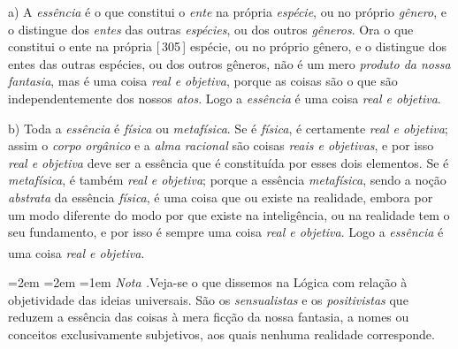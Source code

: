 \documentclass[12pt,a4paper]{article}
\newcommand{\pg}[1]{\thinspace\textup{[\,#1\,]}\thinspace}
\newcommand{\subp}[1]{\medskip\noindent#1)\quad}
\renewcommand\footnote[1]{%
    \stepcounter{footnote}\textsuperscript{\thefootnote}%
    \par
    {\footnotesize
     \leftskip=2em \rightskip=2em \parindent=1em
     \addvspace{\medskipamount}%
     \noindent\textit{Nota \thefootnote.}\enspace #1\par
     \addvspace{\medskipamount}}%
  }
\begin{document}
\subp{a} A \emph{essência} é o que constitui o \emph{ente} na própria
\emph{espécie}, ou no próprio \emph{gênero}, e o distingue dos \emph{entes} das
outras \emph{espécies}, ou dos outros \emph{gêneros}. Ora o que constitui o
ente na própria \pg{305} espécie, ou no próprio gênero, e o distingue dos entes
das outras espécies, ou dos outros gêneros, não é um mero \emph{produto da
nossa fantasia}, mas é uma coisa \emph{real e objetiva}, porque as coisas são o
que são independentemente dos nossos \emph{atos}. Logo a \emph{essência} é uma
coisa \emph{real e objetiva}.

\subp{b} Toda a \emph{essência} é \emph{física} ou \emph{metafísica}. Se é
\emph{física}, é certamente \emph{real e objetiva}; assim o \emph{corpo
orgânico} e a \emph{alma racional} são coisas \emph{reais e objetivas}, e por
isso \emph{real e objetiva} deve ser a essência que é constituída por esses dois
elementos. \textemdash{} Se é \emph{metafísica}, é também \emph{real e
objetiva}; porque a essência \emph{metafísica}, sendo a noção \emph{abstrata} da
essência \emph{física}, é uma coisa que \textemdash{} ou existe na realidade,
embora por um modo diferente do modo por que existe na inteligência,
\textemdash{} ou na realidade tem o seu fundamento, e por isso é sempre uma
coisa \emph{real e objetiva}. Logo a \emph{essência} é uma coisa \emph{real e
objetiva}.\footnote{Veja-se o que dissemos na Lógica com relação à
objetividade das ideias universais. \textemdash{} São os \emph{sensualistas} e
os \emph{positivistas} que reduzem a essência das coisas à mera ficção da nossa
fantasia, a nomes ou conceitos exclusivamente subjetivos, aos quais nenhuma
realidade corresponde.}
\end{document}
